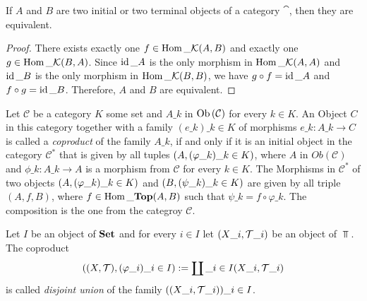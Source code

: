 \begin{theorem} \cite[p. 83]{Alg1&2}
	If $A$ and $B$ are two initial or two terminal objects of a category $\cat$, then they are equivalent. 
\end{theorem}
\begin{proof}
	There exists exactly one $f \in \operatorname{Hom}\_\mathcal K(A, B)$ and exactly one $g \in \operatorname{Hom}\_\mathcal K(B,A)$. Since $\operatorname{id}\_A$ is the only morphism in $\operatorname{Hom}\_\mathcal K(A, A)$ and $\operatorname{id}\_B$ is the only morphism in $\operatorname{Hom}\_\mathcal K(B, B)$, we have $g \circ f = \operatorname{id}\_A$ and $f \circ g = \operatorname{id}\_B$. Therefore, $A$ and $B$ are equivalent. 
\end{proof}

\begin{definition}
	Let $\mathcal{C}$ be a category $K$ some set and $A\_k$ in $\operatorname{Ob}{\left ( \mathcal{C} \right )}$ for every $k \in K$. An Object $C$ in this category together with a family $(e\_k)\_{k \in K}$ of morphisms $e\_k: A\_k \to C$ is called a \textit{coproduct} of the family $A\_k$, if and only if it is an initial object in the category $\mathcal{C}^\ast$ that is given by all tuples ${\left ( A, (\varphi\_k)\_{k \in K} \right )}$, where $A$ in $Ob(\mathcal{C})$ and $\phi\_k: A\_k \to A$ is a morphism from $\mathcal{C}$ for every $k \in K$. The Morphisms in $\mathcal{C}^\ast$ of two objects ${\left ( A, (\varphi\_k)\_{k \in K} \right )}$ and ${\left ( B, (\psi\_k)\_{k \in K} \right )}$ are given by all triple $(A, f, B)$, where $f \in \operatorname{Hom}\_\mathbf{Top}(A, B)$ such that $\psi\_k = f \circ \varphi\_k$. The composition is the one from the categroy $\mathcal{C}$. 
\end{definition}

\begin{definition}
	Let $I$ be an object of $\mathbf{Set}$ and for every $i \in I$ let ${\left ( X\_i, \mathcal{T}\_i \right )}$ be an object of $\Top$. The coproduct 
	\begin{align*}
	\pbraces{\tspace, \pbraces{\varphi\_i}\_{i \in I}} := \coprod\_{i \in I} \pbraces{X\_i, \Tc\_i}
	\end{align*}
	is called \textit{disjoint union} of the family ${\left ( {\left ( X\_i, \mathcal{T}\_i \right )} \right )}\_{i \in I}$.
\end{definition}

